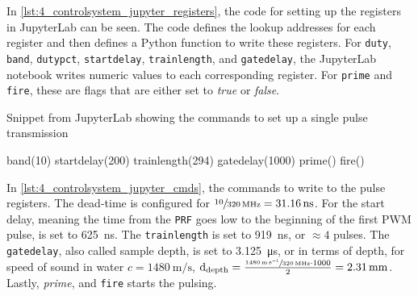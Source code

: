 In \cref{lst:4_controlsystem_jupyter_registers}, the code for setting up the registers in JupyterLab can be seen. The code defines the lookup addresses for each register and then defines a Python function to write these registers. For \texttt{duty}, \texttt{band}, \texttt{dutypct}, \texttt{startdelay}, \texttt{trainlength}, and \texttt{gatedelay}, the JupyterLab notebook writes numeric values to each corresponding register. For \texttt{prime} and \texttt{fire}, these are flags that are either set to \textit{true} or \textit{false}.

\begin{listing}[htbp]
	\centering
	\caption{Snippet from JupyterLab showing the commands to set up a single pulse transmission}
	\label{lst:4_controlsystem_jupyter_cmds}
	\begin{mintedpython}
band(10)
startdelay(200)
trainlength(294)
gatedelay(1000)
prime()
fire()
	\end{mintedpython}
\end{listing}
In \cref{lst:4_controlsystem_jupyter_cmds}, the commands to write to the pulse registers. The dead-time is configured for $\sfrac{10}{\qty{320}{\mega\hertz}}=\qty{31.16}{\nano\second}$. For the start delay, meaning the time from the \texttt{PRF} goes \gls{low} to the beginning of the first PWM pulse, is set to \qty{625}{\nano\second}. The \texttt{trainlength} is set to \qty{919}{\nano\second}, or $\approx4$ pulses. The \texttt{gatedelay}, also called sample depth, is set to \qty{3.125}{\micro\second}, or in terms of depth, for speed of sound in water $c=\qty{1480}{\meter\per\second}$, $\mathrm{d}_{\mathrm{depth}}=\frac{\sfrac{\qty{1480}{\meter\per\second}}{\qty{320}{\mega\hertz}}\cdot1000}{2}=\qty{2.31}{\milli\meter}$. Lastly, \textit{prime}, and \texttt{fire} starts the pulsing.

